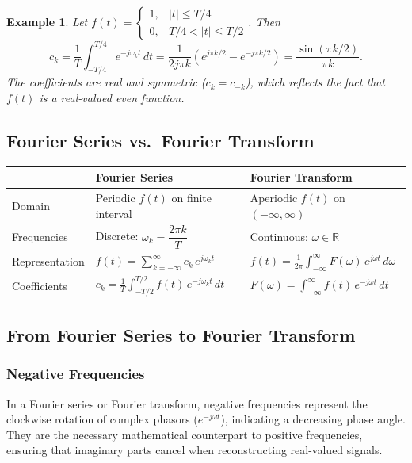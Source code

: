 \documentclass{article}
\newtheorem*{example}{Example}
\begin{document}
\begin{example}
    Let $f(t) = \begin{cases} 1, & |t| \leq T/4 \\ 0, & T/4 < |t| \leq T/2 \end{cases}$. Then
    \[c_k = \frac{1}{T}\int_{-T/4}^{T/4} e^{-j\omega_k t}\,dt = \frac{1}{2j\pi k}\!\left(e^{j\pi k/2} - e^{-j\pi k/2}\right) = \frac{\sin(\pi k/2)}{\pi k}.\]
    The coefficients are real and symmetric ($c_k = c_{-k}$), which reflects the fact that $f(t)$ is a real-valued even function.
\end{example}

\subsection{Fourier Series vs.\ Fourier Transform}

\begin{center}
{\renewcommand{\arraystretch}{1.4}
\begin{tabular}{|l|l|l|}
    \hline
    & \textbf{Fourier Series} & \textbf{Fourier Transform} \\
    \hline
    Domain      & Periodic $f(t)$ on finite interval & Aperiodic $f(t)$ on $(-\infty, \infty)$ \\
    \hline
    Frequencies & Discrete: $\omega_k = \dfrac{2\pi k}{T}$ & Continuous: $\omega \in \mathbb{R}$ \\
    \hline
    Representation & $\displaystyle f(t) = \sum_{k=-\infty}^{\infty} c_k\,e^{j\omega_k t}$ & $\displaystyle f(t) = \frac{1}{2\pi}\int_{-\infty}^{\infty} F(\omega)\,e^{j\omega t}\,d\omega$ \\
    \hline
    Coefficients & $\displaystyle c_k = \frac{1}{T}\int_{-T/2}^{T/2} f(t)\,e^{-j\omega_k t}\,dt$ & $\displaystyle F(\omega) = \int_{-\infty}^{\infty} f(t)\,e^{-j\omega t}\,dt$ \\
    \hline
\end{tabular}}
\end{center}
\subsection{From Fourier Series to Fourier Transform}

\subsubsection{Negative Frequencies}
In a Fourier series or Fourier transform, negative frequencies represent the clockwise rotation of complex phasors ($e^{-j\omega t}$), indicating a decreasing phase angle. They are the necessary mathematical counterpart to positive frequencies, ensuring that imaginary parts cancel when reconstructing real-valued signals.
\end{document}
